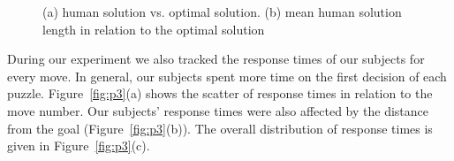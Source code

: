 \documentclass[10pt,letterpaper]{article}
\begin{document}
\begin{figure}
       \centering
       \caption{(a) human solution vs. optimal solution. (b) mean human solution length in relation to the optimal solution}
       \label{fig:p1}
\end{figure}

During our experiment we also tracked the response times of our subjects for every move.  In general, our subjects spent more time on the first decision of each puzzle. Figure~\ref{fig:p3}(a) shows the scatter of response times in relation to the move number. Our subjects' response times were also affected by the distance from the goal (Figure~\ref{fig:p3}(b)). The overall distribution of response times is given in Figure~\ref{fig:p3}(c).
\end{document}
